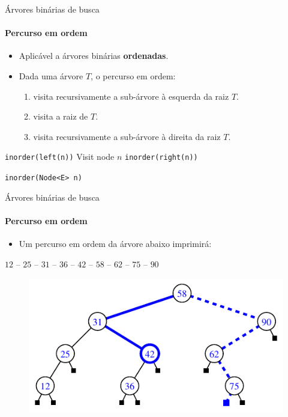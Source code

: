 \begin{frame}{Árvores binárias de busca}
\framesubtitle{Percurso em ordem}
\begin{itemize}
	\item Aplicável a árvores binárias \textbf{ordenadas}.
	\item Dada uma árvore $T$, o percurso em ordem:
	\begin{enumerate}
		\item visita recursivamente a sub-árvore à esquerda da raiz $T$.
		\item visita a raiz de $T$.
		\item visita recursivamente a sub-árvore à direita da raiz $T$.
	\end{enumerate}
\end{itemize}

\bigskip
\bigskip

\begin{algorithm}[H]
	\DontPrintSemicolon
	\texttt{inorder(left(n))}\;
	Visit node $n$\;
	\texttt{inorder(right(n))}\;
	
	\caption{\texttt{inorder(Node<E> n)}}
\end{algorithm}
\end{frame}



\begin{frame}{Árvores binárias de busca}
\framesubtitle{Percurso em ordem}
\begin{itemize}
\item Um percurso em ordem da árvore abaixo imprimirá:
\end{itemize}

\begin{center}
	$12$ -- $25$ -- $31$ -- $36$ -- $42$ -- $58$ -- $62$ -- $75$ -- $90$
\end{center}

\begin{figure}
	\centering
	\includegraphics[width=0.6\linewidth]{img/figure-8-17}
\end{figure}
\end{frame}



